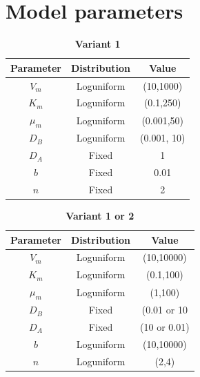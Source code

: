 \appendix
\chapter{Model parameters}

\begin{table}[H]
    \centering
    \caption{\textbf{Variant 1}}
    \label{tab:variant_1}
    \renewcommand{\arraystretch}{1.3} %
    \begin{tabular}{|c|c|c|}
        \hline
        \textbf{Parameter} & \textbf{Distribution} & \textbf{Value}\\
        \hline
        $V_{m}$ & Loguniform & (10,1000)\\
        \hline
        $K_{m}$ & Loguniform & (0.1,250)\\
        \hline
        $\mu_{m}$ & Loguniform & (0.001,50)\\
        \hline
        $D_{B}$ & Loguniform & (0.001, 10)\\
        \hline
        $D_{A}$ & Fixed & 1\\
        \hline
        $b$ & Fixed & 0.01\\
        \hline
        $n$ & Fixed & 2\\
        \hline
    \end{tabular}
\end{table}


\begin{table}[H]
    \centering
    \caption{\textbf{Variant 1 or 2}}
    \label{tab:variant_2}
    \renewcommand{\arraystretch}{1.3} %
    \begin{tabular}{|c|c|c|}
        \hline
        \textbf{Parameter} & \textbf{Distribution} & \textbf{Value}\\
        \hline
        $V_{m}$ & Loguniform & (10,10000)\\
        \hline
        $K_{m}$ & Loguniform & (0.1,100)\\
        \hline
        $\mu_{m}$ & Loguniform & (1,100)\\
        \hline
        $D_{B}$ & Fixed & (0.01 or 10\\
        \hline
        $D_{A}$ & Fixed & (10 or 0.01)\\
        \hline
        $b$ & Loguniform & (10,10000)\\
        \hline
        $n$ & Loguniform & (2,4)\\
        \hline
    \end{tabular}
\end{table}

